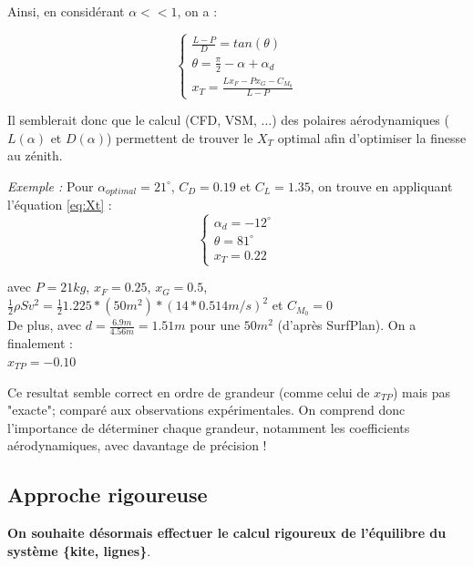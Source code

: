 Ainsi, en considérant $\alpha << 1$, on a :

\begin{equation}
    \begin{cases}
    \frac{L-P}{D} = tan(\theta) \\
    \theta = \frac{\pi}{2} - \alpha + \alpha_d \\
    x_T = \frac{L x_F - P x_G -C_{M_0}}{L - P}
    \end{cases}
    \label{eq:Xt}
\end{equation}
    
Il semblerait donc que le calcul (CFD, VSM, ...) des polaires aérodynamiques ($L(\alpha)$ et $D(\alpha)$) permettent de trouver le $X_T$ optimal afin d'optimiser la finesse au zénith. 

\textit{Exemple : }
Pour $\alpha_{optimal} = 21^\circ$, $C_D = 0.19$ et $C_L = 1.35$, on trouve en appliquant l'équation \ref{eq:Xt} : \\

\begin{equation}
    \begin{cases}
    \alpha_d =  -12^\circ\\
    \theta = 81^\circ\\
    x_T = 0.22
    \end{cases}
    \label{eq:Xt results}
\end{equation}

avec $P = 21 kg$, $x_F = 0.25$, $x_G = 0.5$,$\frac{1}{2} \rho S v^2 = \frac{1}{2} 1.225 * (50m^2) * (14 * 0.514 m/s)^2$  et $C_{M_0} = 0$ \\

De plus, avec  $d = \frac{6.9 m}{4.56 m} = 1.51 m$ pour une $50m^2$ (d'après SurfPlan). On a finalement :\\
$x_{TP} = -0.10 $

Ce resultat semble correct en ordre de grandeur (comme celui de $x_{TP}$) mais pas "exacte"; comparé aux observations expérimentales. On comprend donc l'importance de déterminer chaque grandeur, notamment les coefficients aérodynamiques, avec davantage de précision !

\subsection{Approche rigoureuse} 
\label{subsec:Ch1.2.2}

\textbf{On souhaite désormais effectuer le calcul rigoureux de l'équilibre du système \{kite, lignes\}}.




